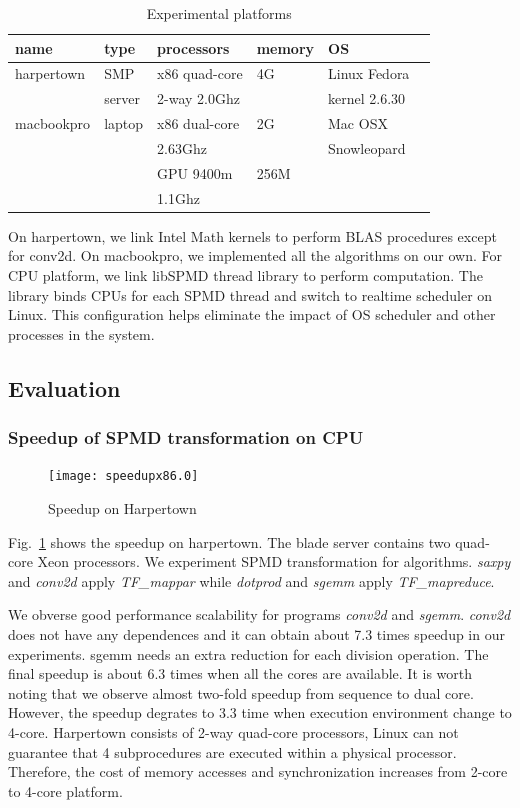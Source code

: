 \documentclass[10pt, conference, compsocconf]{IEEEtran}
\begin{document}
\begin{table}[hbt]
\caption{Experimental platforms}\label{tbl:mach}
\begin{center}
\begin{tabular}{|l|l|l|l|l|r|}
\hline
\textbf{name}&\textbf{type}&\textbf{processors}&\textbf{memory}&\textbf{OS}\\
\hline
harpertown&SMP &x86 quad-core  &4G&Linux Fedora\\
                  &  server &   
2-way  2.0Ghz & &kernel 2.6.30\\
\hline
macbookpro&laptop &x86 dual-core &2G&Mac OSX\\
                    &           & 2.63Ghz         &  &Snowleopard\\
                   &           &GPU 9400m    &256M & \\
                    &           & 1.1Ghz   & &\\
\hline
\end{tabular} 
\end{center}
\end{table}
On harpertown, we link Intel Math kernels to perform BLAS procedures
except for conv2d. On macbookpro, we implemented all the algorithms on
our own. For CPU platform, we link libSPMD thread library to
perform computation. The library binds CPUs for each SPMD
thread and switch to realtime scheduler on Linux.  This configuration
helps eliminate the impact of OS scheduler and other processes in the system.
\subsection{Evaluation}
\subsubsection{Speedup of SPMD transformation on CPU}
\begin{figure}
\texttt{[image: speedupx86.0]}
\caption{Speedup on Harpertown}\label{fig:spdx86}
\end{figure}

Fig.~\ref{fig:spdx86} shows the speedup on harpertown. The blade
server contains two quad-core Xeon
processors. We experiment SPMD transformation for algorithms. \textit{saxpy} and
\textit{conv2d} apply  \emph{TF\_mappar} while \textit{dotprod} and \textit{sgemm} apply \emph{TF\_mapreduce}.

We obverse good performance scalability for programs
\textit{conv2d} and \textit{sgemm}. \textit{conv2d} does not have any dependences
and it can obtain about 7.3 times speedup in our experiments. sgemm
needs an extra reduction for each division operation. The final
speedup is about 6.3 times when all the cores are available. It is worth noting that we
observe almost two-fold speedup from sequence to dual core. However,
the speedup degrates to 3.3 time when execution
environment change to 4-core. Harpertown consists of  2-way quad-core processors,  Linux
can not guarantee that 4 subprocedures are executed within a physical
processor. Therefore, the cost of memory accesses and synchronization
increases from 2-core to 4-core platform. 
\end{document}
